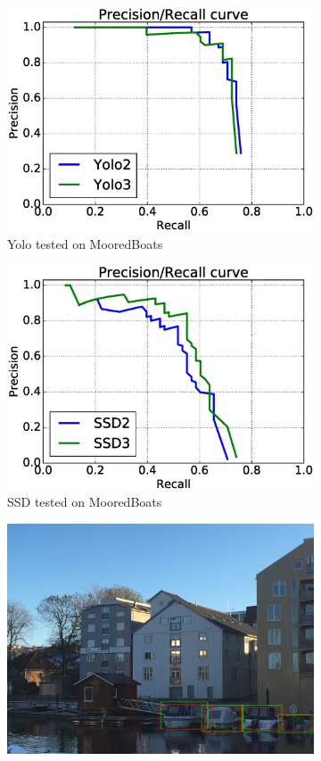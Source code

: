 \begin{figure}[h!]
\begin{subfigure}{.5\textwidth}
  \centering
  \includegraphics[width=0.8\linewidth]{results/case_buildings/prec_recall/yolo/bb.eps}
  \caption{Yolo tested on MooredBoats}
  \label{fig:ex_bnbb_prec_rec_yolo}
\end{subfigure}%
\begin{subfigure}{.5\textwidth}
  \centering
  \includegraphics[width=.8\linewidth]{results/case_buildings/prec_recall/ssd/bb.eps}
  \caption{SSD tested on MooredBoats}
  \label{fig:ex_bnbb_prec_rec_ssd}
\end{subfigure}
\begin{subfigure}{.5\textwidth}
  \centering
  \includegraphics[width=0.8\linewidth]{results/case_buildings/prec_recall/yolo/IMG_2077_bbnb.jpg}

\end{subfigure}
\end{figure}
